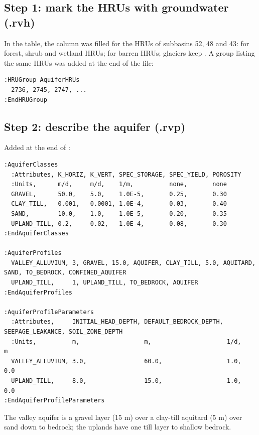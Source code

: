 \subsection{Step 1: mark the HRUs with groundwater (.rvh)}
In the  table, the  column was filled for the HRUs of subbasins 52, 48 and 43:
 for forest, shrub and wetland HRUs;  for barren HRUs; glaciers keep \cmd{[NONE]}.
A group listing the same HRUs was added at the end of the file:
\par\noindent\begin{minipage}{\linewidth}
\begin{lstlisting}
:HRUGroup AquiferHRUs
  2736, 2745, 2747, ...
:EndHRUGroup
\end{lstlisting}
\end{minipage}\par\smallskip

\subsection{Step 2: describe the aquifer (.rvp)}
Added at the end of :
\begin{lstlisting}
:AquiferClasses
  :Attributes, K_HORIZ, K_VERT, SPEC_STORAGE, SPEC_YIELD, POROSITY
  :Units,      m/d,     m/d,    1/m,          none,       none
  GRAVEL,      50.0,    5.0,    1.0E-5,       0.25,       0.30
  CLAY_TILL,   0.001,   0.0001, 1.0E-4,       0.03,       0.40
  SAND,        10.0,    1.0,    1.0E-5,       0.20,       0.35
  UPLAND_TILL, 0.2,     0.02,   1.0E-4,       0.08,       0.30
:EndAquiferClasses

:AquiferProfiles
  VALLEY_ALLUVIUM, 3, GRAVEL, 15.0, AQUIFER, CLAY_TILL, 5.0, AQUITARD, SAND, TO_BEDROCK, CONFINED_AQUIFER
  UPLAND_TILL,     1, UPLAND_TILL, TO_BEDROCK, AQUIFER
:EndAquiferProfiles

:AquiferProfileParameters
  :Attributes,     INITIAL_HEAD_DEPTH, DEFAULT_BEDROCK_DEPTH, SEEPAGE_LEAKANCE, SOIL_ZONE_DEPTH
  :Units,          m,                  m,                     1/d,              m
  VALLEY_ALLUVIUM, 3.0,                60.0,                  1.0,              0.0
  UPLAND_TILL,     8.0,                15.0,                  1.0,              0.0
:EndAquiferProfileParameters
\end{lstlisting}
The valley aquifer is a gravel layer (15 m) over a clay-till aquitard (5 m) over sand down to bedrock; the uplands have one
till layer to shallow bedrock.


